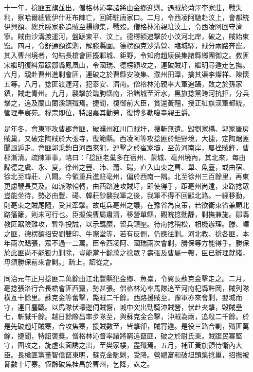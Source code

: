 \begin{pinyinscope}
十一年，捻匪五旗並出，僧格林沁率諸將由金鄉迎剿。遇賊於菏澤李家莊，戰失利，察哈爾總管伊什旺布陣亡，回師駐唐家口。二月，令西凌阿馳赴汶上，會都統伊興額、總兵滕家勝追賊至楊柳集，戰歿。僧格林沁親駐汶上，令西凌阿回守濟寧。賊由沙溝渡運河，盤踞東平、汶上。德楞額追擊於小汶河北岸，破之，賊始東竄。四月，令舒通額進剿，解滕縣圍。德楞額克沙溝營、臨城驛，賊分兩路奔竄。其入曹州境者，勾結長槍會匪擾鄆城、鉅野，令知府趙康侯集諸縣鄉團御之。教匪宋繼明復糾眾踞鄒縣鳳凰山，令國瑞、德楞額攻之，連破賊圩，繼明尋遁走乞撫。六月，親赴曹州進剿會匪，連破之於曹縣安陵集、濮州田潭，擒其渠李燦祥、陳懷五等。八月，捻匪渡運河，犯泰安、濟南。僧格林沁親率大軍追躡，敗之於孫家鎮，賊走青州。九月，襲擊於臨朐縣南，沿諸城至沂水，黑旗捻黨跨河抗拒，分兵擊之，追及蘭山蘭溪鎮殲焉。捷聞，復御前大臣，賞還黃韁，授正紅旗漢軍都統，管理奉宸苑。穆宗即位，特詔嘉其勤勞，復博多勒噶臺親王爵。

是年冬，會東軍攻曹郡會匪，破濮州紅川口賊圩，搜斬無遺。毀劉家橋、郭家唐房賊巢，又破定陶賊於大張寺，復範縣。西凌阿等攻捻匪於鉅野境，大捷，定陶踞匪聞風遁走。會匪郭秉鈞自河西來犯，連擊之於崔家壩，至黃河南岸，屢挫賊鋒，曹郡漸清。疏陳軍事，略曰：「捻匪老巢多在宿州、蒙城、亳州境內，其北來，每由歸德之虞、永、夏，徐州之豐、沛、蕭、碭，直入山東之曹、單、魚臺，或由宿、徐北至韓莊、八閘。今領重兵進駐亳州，偏於西南一隅。北至徐州三百餘里，再東更慮鞭長莫及。如派隊輪轉，由西路進攻賊圩，即使得手，距亳州尚遠，東路捻眾豈能坐待，勢必由豐、碭、韓莊鈔襲我軍之後，我軍不得不回顧北路。一經移動，則亳東之賊尾隨，受其牽掣。故屯兵亳州之議，在豫省為良策，若欲衛東省兼顧北路籓籬，則未可行也。臣擬俟曹屬肅清，移營單縣，觀皖捻動靜，剿撫兼施。鄒縣教匪踞險難攻，暫準投誠，以示羈縻，留兵鎮壓。待南捻稍松，相機辦理。滕、嶧之匪，德楞額招安劉雙印、牛際堂等，若有反側，仍應往剿。河北教、捻各匪，本年兩次鴟張，眾不過一二萬。臣令西凌阿、國瑞兩次會剿，勝保等方能得手。勝保於此匪尚不能獨力剿除，豈能當十餘萬之捻眾？壽張及曹屬一帶，臣已辦理就緒，毋須勝保前來會剿。」疏上，詔從之。

同治元年正月捻匪二萬餘由江北豐縣犯金鄉、魚臺，令翼長蘇克金擊走之。二月，亳捻張洛行合長槍會匪西竄，勢甚張。僧格林沁率馬隊追至河南杞縣許岡，賊列隊橫亙十餘里。蘇克金等奮擊，斃賊二千餘。西路援賊至，豫軍亦來會剿，嬰城而守，連日鏖戰。以馬隊伏壕邊伺賊懈，城中突出勁騎沖賊營，伏赴夾擊，毀賊壘七，斬馘千餘。越日餘際昌率步隊至，與蘇克金合擊，沖賊為兩，追殺二千餘。於是先破趙圩賊寨，合攻焦寨，援賊數至，皆擊卻，賊宵遁。是役三路合剿，殲匪萬餘，捷聞，特詔褒獎。僧格林沁督率諸將窮追竄匪，破之於尉氏東。賊踞民寨堅守，圍攻之，旋虛東面誘之出，至樊家樓，盡殲焉。五月，補正黃旗領侍衛內大臣。長槍匪黨董智信竄東明，蘇克金馳剿，受降。營總富和破坦頭集捻巢，招撫被脅數十圩寨。恆齡破焦桂昌於曹州，乞降，誅之。


\end{pinyinscope}

